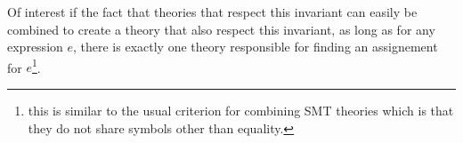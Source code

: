 Of interest if the fact that theories that respect this invariant can easily be combined
to create a theory that also respect this invariant, as long as for any expression $e$,
there is exactly one theory responsible for finding an assignement for $e$\footnote{this
is similar to the usual criterion for combining SMT theories which is that they do not
share symbols other than equality.}.


